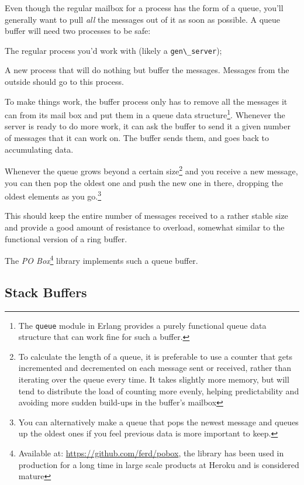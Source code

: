 \documentclass[11pt, oneside]{book}   	%
\newcommand{\module}[1]{\Verb`#1`}
\begin{document}
Even though the regular mailbox for a process has the form of a queue, you'll generally want to pull \emph{all} the messages out of it as soon as possible. A queue buffer will need two processes to be safe:

\begin{itemize*}
	\item The regular process you'd work with (likely a \module{gen\_server});
	\item A new process that will do nothing but buffer the messages. Messages from the outside should go to this process.
\end{itemize*}

To make things work, the buffer process only has to remove all the messages it can from its mail box and put them in a queue data structure\footnote{The \module{queue} module in Erlang provides a purely functional queue data structure that can work fine for such a buffer.}. Whenever the server is ready to do more work, it can ask the buffer to send it a given number of messages that it can work on. The buffer sends them, and goes back to accumulating data.


Whenever the queue grows beyond a certain size\footnote{To calculate the length of a queue, it is preferable to use a counter that gets incremented and decremented on each message sent or received, rather than iterating over the queue every time. It takes slightly more memory, but will tend to distribute the load of counting more evenly, helping predictability and avoiding more sudden build-ups in the buffer's mailbox} and you receive a new message, you can then pop the oldest one and push the new one in there, dropping the oldest elements as you go.\footnote{You can alternatively make a queue that pops the newest message and queues up the oldest ones if you feel previous data is more important to keep.}

This should keep the entire number of messages received to a rather stable size and provide a good amount of resistance to overload, somewhat similar to the functional version of a ring buffer.

The \emph{PO Box}\footnote{Available at: \href{https://github.com/ferd/pobox}{https://github.com/ferd/pobox}, the library has been used in production for a long time in large scale products at Heroku and is considered mature} library implements such a queue buffer.

\subsection{Stack Buffers}
\end{document}

